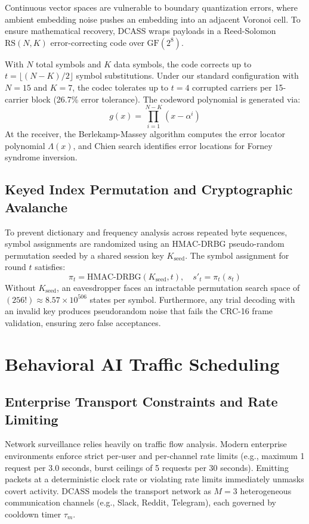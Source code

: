 \documentclass[11pt,journal,onecolumn]{IEEEtran}\linespread{1.3}
\begin{document}
Continuous vector spaces are vulnerable to boundary quantization errors, where ambient embedding noise pushes an embedding into an adjacent Voronoi cell. To ensure mathematical recovery, DCASS wraps payloads in a Reed-Solomon $\text{RS}(N, K)$ error-correcting code over $\text{GF}(2^8)$.

With $N$ total symbols and $K$ data symbols, the code corrects up to $t = \lfloor (N - K) / 2 \rfloor$ symbol substitutions. Under our standard configuration with $N = 15$ and $K = 7$, the codec tolerates up to $t = 4$ corrupted carriers per 15-carrier block (26.7\% error tolerance). The codeword polynomial is generated via:
\begin{equation}
g(x) = \prod_{i=1}^{N-K} (x - \alpha^i)
\end{equation}
At the receiver, the Berlekamp-Massey algorithm computes the error locator polynomial $\Lambda(x)$, and Chien search identifies error locations for Forney syndrome inversion.

\subsection{Keyed Index Permutation and Cryptographic Avalanche}

To prevent dictionary and frequency analysis across repeated byte sequences, symbol assignments are randomized using an HMAC-DRBG pseudo-random permutation seeded by a shared session key $K_{\text{seed}}$. The symbol assignment for round $t$ satisfies:
\begin{equation}
\pi_t = \text{HMAC-DRBG}(K_{\text{seed}}, t), \quad s'_t = \pi_t(s_t)
\end{equation}
Without $K_{\text{seed}}$, an eavesdropper faces an intractable permutation search space of $(256!) \approx 8.57 \times 10^{506}$ states per symbol. Furthermore, any trial decoding with an invalid key produces pseudorandom noise that fails the CRC-16 frame validation, ensuring zero false acceptances.

\section{Behavioral AI Traffic Scheduling}

\subsection{Enterprise Transport Constraints and Rate Limiting}

Network surveillance relies heavily on traffic flow analysis. Modern enterprise environments enforce strict per-user and per-channel rate limits (e.g., maximum 1 request per 3.0 seconds, burst ceilings of 5 requests per 30 seconds). Emitting packets at a deterministic clock rate or violating rate limits immediately unmasks covert activity. DCASS models the transport network as $M = 3$ heterogeneous communication channels (e.g., Slack, Reddit, Telegram), each governed by cooldown timer $\tau_m$.
\end{document}
